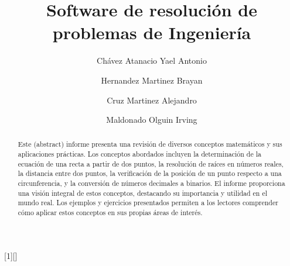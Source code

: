 \documentclass{IEEEcsmag}
\begin{document}
[1][]
{}
{}



\title{Software de resolución de problemas de Ingeniería }

\author{Chávez Atanacio Yael Antonio}

\author{Hernandez Martinez Brayan}

\author{Cruz Martinez Alejandro}

\author{Maldonado Olguin Irving}



\begin{abstract}
Este (abstract) informe presenta una revisión de diversos conceptos matemáticos y sus aplicaciones prácticas. Los conceptos abordados incluyen la determinación de la ecuación de una recta a partir de dos puntos, la resolución de raíces en números reales, la distancia entre dos puntos, la verificación de la posición de un punto respecto a una circunferencia, y la conversión de números decimales a binarios.
El informe proporciona una visión integral de estos conceptos, destacando su importancia y utilidad en el mundo real. Los ejemplos y ejercicios presentados permiten a los lectores comprender cómo aplicar estos conceptos en sus propias áreas de interés.
\end{abstract}
\end{document}
